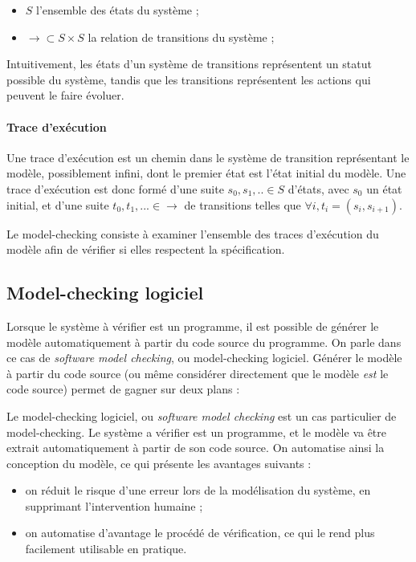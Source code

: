 \begin{itemize}
\item
  \(S\) l'ensemble des états du système ;
\item
  \(\rightarrow \subset S \times S\) la relation de transitions du
  système ;
\end{itemize}

Intuitivement, les états d'un système de transitions représentent un
statut possible du système, tandis que les transitions représentent les
actions qui peuvent le faire évoluer.

\paragraph{Trace d'exécution}
Une trace d'exécution est un chemin dans le système de transition
représentant le modèle, possiblement infini, dont le premier état est
l'état initial du modèle. Une trace d'exécution est donc formé d'une
suite \(s_0, s_1, .. \in S\) d'états, avec \(s_0\) un état initial, et
d'une suite \(t_0, t_1, ... \in \rightarrow\) de transitions telles que
\(\forall i, t_i = (s_i, s_{i+1})\).

Le model-checking consiste à examiner l'ensemble des traces
d'exécution du modèle afin de vérifier si elles respectent la spécification.

\subsection{Model-checking logiciel}

Lorsque le système à vérifier est un programme, il est possible de
générer le modèle automatiquement à partir du code source du programme.
On parle dans ce cas de \emph{software model checking}, ou
model-checking logiciel. Générer le modèle à partir du code source (ou
même considérer directement que le modèle \emph{est} le code source)
permet de gagner sur deux plans :

Le model-checking logiciel, ou \emph{software model checking} est un cas
particulier de model-checking. Le système a vérifier est un programme, et le
modèle va être extrait automatiquement à partir de son code source.
On automatise ainsi la conception du modèle, ce qui présente les avantages
suivants :

\begin{itemize}
\item
  on réduit le risque d'une erreur lors de la modélisation du système,
  en supprimant l'intervention humaine ;
\item
  on automatise d'avantage le procédé de vérification, ce qui le rend
  plus facilement utilisable en pratique.
\end{itemize}

